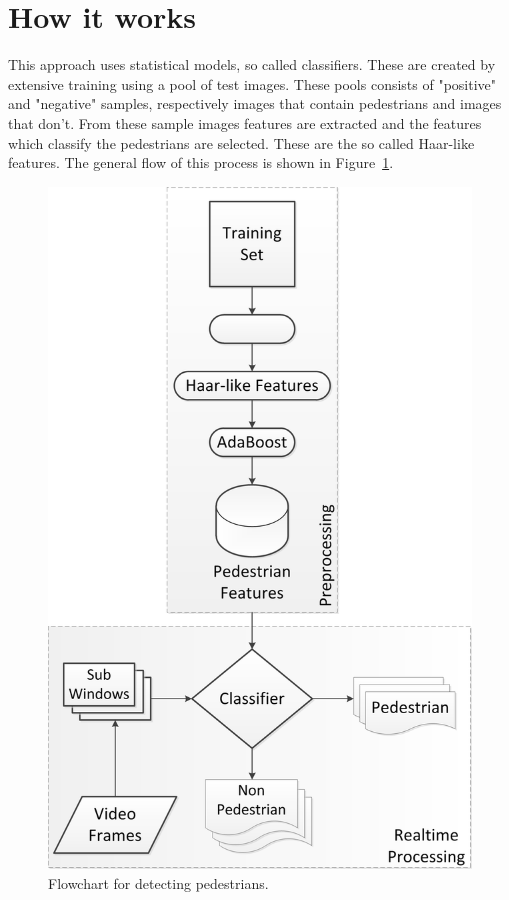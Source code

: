 \documentclass{article}
\begin{document}
\section{How it works}
This approach uses statistical models, so called classifiers. These are created by extensive training using a pool of test images. These pools consists of "positive" and "negative" samples, respectively images that contain pedestrians and images that don't. From these sample images features are extracted and the features which classify the pedestrians are selected. These are the so called Haar-like features. The general flow of this process is shown in Figure~\ref{fig:flowchart}.
\begin{figure}[h!]
\centering
\includegraphics[scale=0.5]{HaarTrainingFlowChart.png}
\caption{Flowchart for detecting pedestrians.}
\label{fig:flowchart}
\end{figure}
\end{document}
